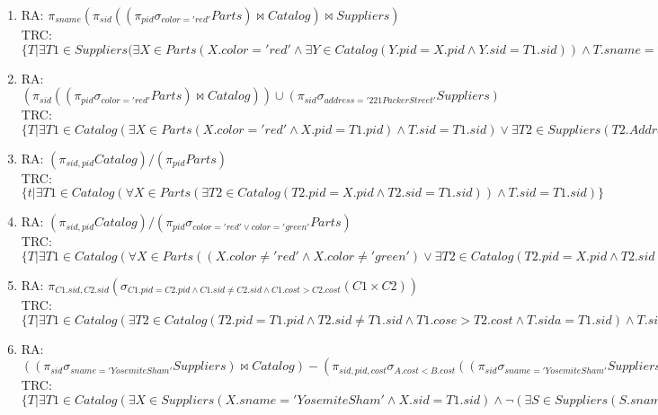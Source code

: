 \documentclass[11pt]{article}
\begin{document}
\begin{enumerate}
\item RA: $\pi_{sname}(\pi_{sid}((\pi_{pid}\sigma_{color = 'red'}Parts)\bowtie Catalog)\bowtie Suppliers)$ \\
TRC: $\{T|\exists T1\in Suppliers(\exists X\in Parts(X.color = 'red' \wedge \exists Y \in Catalog(Y.pid = X.pid \wedge Y.sid = T1.sid))\wedge T.sname = T1.sname\}$ 
\setcounter{enumi}{2}
\item RA: $(\pi_{sid}((\pi_{pid}\sigma_{color='red'}Parts)\bowtie Catalog))\cup(\pi_{sid}\sigma_{address='221PackerStreet'}Suppliers)$ \\
TRC: $\{T|\exists T1 \in Catalog(\exists X \in Parts(X.color = 'red'\wedge X.pid=T1.pid)\wedge T.sid=T1.sid)\vee\exists T2 \in Suppliers(T2.Address='221packerStreet'\wedge T.sid=T2.sid)\}$ 
\setcounter{enumi}{4}
\item RA: $(\pi_{sid,pid}Catalog)/(\pi_{pid}Parts)$ \\
TRC: $\{t|\exists T1 \in Catalog(\forall X \in Parts(\exists T2 \in Catalog(T2.pid=X.pid \wedge T2.sid=T1.sid))\wedge T.sid=T1.sid)\}$
\setcounter{enumi}{6}
\item RA: $(\pi_{sid,pid}Catalog)/(\pi_{pid}\sigma_{color='red'\vee color='green'}Parts)$ \\
TRC: $\{T|\exists T1 \in Catalog(\forall X \in Parts((X.color \neq 'red' \wedge X.color \neq 'green')\vee \exists T2 \in Catalog(T2.pid = X.pid \wedge T2.sid = T1.sid))\wedge T.sid = T1.sid)\}$
\setcounter{enumi}{8}
\item RA: $\pi_{C1.sid,C2.sid}(\sigma_{C1.pid=C2.pid\wedge C1.sid\neq C2.sid\wedge C1.cost>C2.cost}(C1\times C2))$ \\
TRC: $\{T | \exists T1 \in Catalog(\exists T2 \in Catalog(T2.pid = T1.pid \wedge T2.sid \neq T1.sid \wedge T1.cose > T2.cost \wedge T.sida=T1.sid)\wedge T.sidb=T2.sid)\}$
\setcounter{enumi}{10}
\item RA: $((\pi_{sid}\sigma_{sname = 'YosemiteSham'}Suppliers)\bowtie Catalog)-(\pi_{sid,pid,cost}\sigma_{A.cost<B.cost}((\pi_{sid}\sigma_{sname = 'YosemiteSham'}Suppliers)\bowtie Catalog)\times (\pi_{sid}\sigma_{sname = 'YosemiteSham'}Suppliers)\bowtie Catalog)))$ \\
TRC: $\{T | \exists T1 \in Catalog(\exists X \in Suppliers (X.sname='YosemiteSham'\wedge X.sid = T1.sid)\wedge \neg (\exists S \in Suppliers(S.sname = 'YosemiteSham' \wedge \exists Z \in Catalog(Z.sid = S.sid \wedge Z.cost > T1.cost)))\wedge T.pid=T1.pid)\}$
\end{enumerate}
\end{document}
